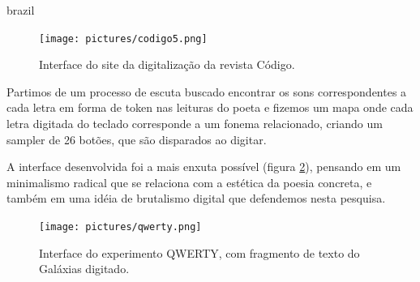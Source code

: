 \begin{otherlanguage*}{brazil}
\begin{figure}[htb]
    \caption{\label{codigo}Interface do site da digitalização da revista Código. }
    \begin{center}
    \texttt{[image: pictures/codigo5.png]}
    \end{center}
\end{figure}

Partimos de um processo de escuta buscado encontrar os sons correspondentes a cada letra em forma de token nas leituras do poeta e fizemos um mapa onde cada letra digitada do teclado corresponde a um fonema relacionado, criando um sampler de 26 botões, que são disparados ao digitar.

A interface desenvolvida foi a mais enxuta possível (figura \ref{qwerty}), pensando em um minimalismo radical que se relaciona com a estética da poesia concreta, e também em uma idéia de brutalismo digital que defendemos nesta pesquisa.

\begin{figure}[htb]
    \caption{\label{qwerty}Interface do experimento QWERTY, com fragmento de texto do Galáxias digitado. }
    \begin{center}
    \texttt{[image: pictures/qwerty.png]}
    \end{center}
\end{figure}






\end{otherlanguage*}
